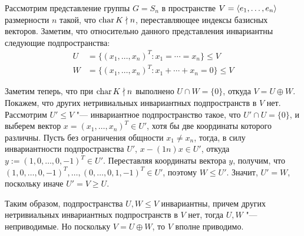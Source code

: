 \begin{example}
	Рассмотрим представление группы $G = S_n$ в пространстве $V = \langle e_1, \dotsc, e_n \rangle$ размерности $n$ такой, что $\operatorname{char}{K} \nmid n$, переставляющее индексы базисных векторов. Заметим, что относительно данного представления инвариантны следующие подпространства:
	\begin{align*}
		U &= \{(x_1, \dotsc, x_n)^T : x_1 = \dotsb = x_n\} \le V
		\\
		W &= \{(x_1, \dotsc, x_n)^T : x_1 + \dotsb + x_n = 0\} \le V
	\end{align*}
	
	Заметим теперь, что при $\operatorname{char}{K} \nmid n$ выполнено $U \cap W = \{0\}$, откуда $V= U \oplus W$. Покажем, что других нетривиальных инвариантных подпространств в $V$ нет. Рассмотрим $U' \le V$ "--- инвариантное подпространство такое, что $U' \cap U = \{0\}$, и выберем вектор $x = (x_1, \dotsc, x_n)^T \in U'$, хотя бы две координаты которого различны. Пусть без ограничения общности $x_1 \ne x_n$, тогда, в силу инвариантности подпространства $U'$, $x - (1n)x \in U'$, откуда $y := (1, 0, \dotsc, 0, -1)^T \in U'$. Переставляя координаты вектора $y$, получим, что $(1, 0, \dotsc, 0, -1)^T, \dotsc, (0, \dotsc, 0, 1, -1)^T \in U'$, поэтому $W \le U'$. Значит, $U' = W$, поскольку иначе $U' = V \ge U$.
	
	Таким образом, подпространства $U, W \le V$ инвариантны, причем других нетривиальных инвариантных подпространств в $V$ нет, тогда $U, W$ "--- неприводимые. Но поскольку $V = U \oplus W$, то $V$ вполне приводимо.
\end{example}